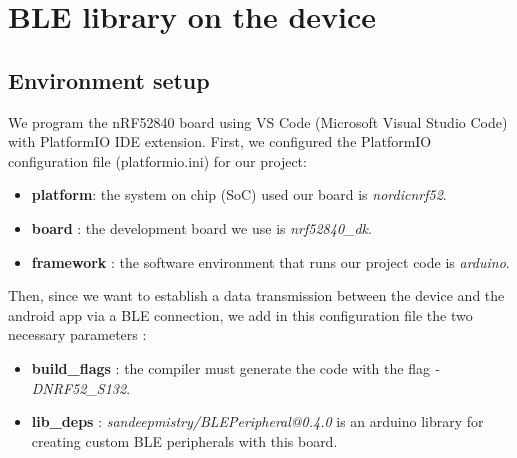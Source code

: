 \section{BLE library on the device}
\subsection{Environment setup}
We program the nRF52840 board using VS Code (Microsoft Visual Studio Code) with PlatformIO IDE extension.
First, we configured the PlatformIO configuration file (platformio.ini) for our project:
\begin{itemize}
    \item \textbf{platform}: the system on chip (SoC) used our board is \textit{nordicnrf52}.
    \item \textbf{board} : the development board we use is \textit{nrf52840\_dk}.
    \item \textbf{framework} : the software environment that runs our project code is \textit{arduino}.
\end{itemize}
Then, since we want to establish a data transmission between the device and the android app via a BLE connection, we add in this configuration file the two necessary parameters : 
\begin{itemize}
    \item \textbf{build\_flags} : the compiler must generate the code with the flag \textit{-DNRF52\_S132}.
    \item \textbf{lib\_deps} : \textit{sandeepmistry/BLEPeripheral@0.4.0} is an arduino library for creating custom BLE peripherals with this board.
\end{itemize}
